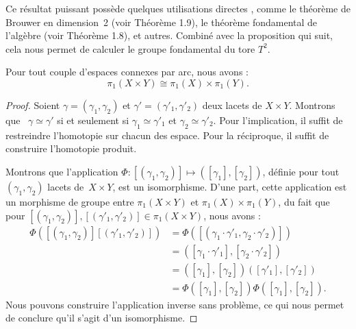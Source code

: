 Ce résultat puissant possède quelques utilisations directes \cite{Hatcher}, comme le théorème de Brouwer en dimension~2 (voir Théorème 1.9), le théorème fondamental de l'algèbre (voir Théorème 1.8), et autres. Combiné avec la proposition qui suit, cela nous permet de calculer le groupe fondamental du tore $T^2$.

\begin{proposition}\label{prop:gr-fund-pair}
Pour tout couple d'espaces connexes par arc, nous avons :\[\pi_1(X\times Y)\cong\pi_1(X)\times\pi_1(Y).\]
\end{proposition}

\begin{proof}
Soient $\gamma=(\gamma_1,\gamma_2)$ et $\gamma'=(\gamma'_1,\gamma'_2)$ deux lacets de $X\times Y$. Montrons que ~${\gamma\simeq \gamma'}$ si et seulement si $\gamma_1\simeq\gamma'_1$ et $\gamma_2\simeq\gamma'_2$. Pour l'implication, il suffit de restreindre l'homotopie sur chacun des espace. Pour la réciproque, il suffit de construire l'homotopie produit.

Montrons que l'application $\Phi:[(\gamma_1,\gamma_2)]\mapsto([\gamma_1],[\gamma_2])$, définie pour tout $(\gamma_1,\gamma_2)$ lacets de~$X\times Y$, est un isomorphisme. D'une part, cette application est un morphisme de groupe entre $\pi_1(X\times Y)$ et $\pi_1(X)\times\pi_1(Y)$, du fait que pour $[(\gamma_1,\gamma_2)],[(\gamma'_1,\gamma'_2)]\in\pi_1(X\times Y)$, nous avons : \[\begin{split}
\Phi([(\gamma_1,\gamma_2)][(\gamma'_1,\gamma'_2)])&=\Phi([(\gamma_1\cdot\gamma'_1,\gamma_2\cdot\gamma'_2)])\\
&=([\gamma_1\cdot\gamma'_1],[\gamma_2\cdot\gamma'_2])\\
&=([\gamma_1],[\gamma_2])([\gamma'_1],[\gamma'_2])\\
&=\Phi([\gamma_1],[\gamma_2])\Phi([\gamma_1],[\gamma_2]).
\end{split}\]Nous pouvons construire l'application inverse sans problème, ce qui nous permet de conclure qu'il s'agit d'un isomorphisme.
\end{proof}

